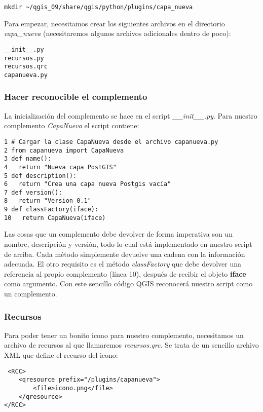 \begin{verbatim}
mkdir ~/qgis_09/share/qgis/python/plugins/capa_nueva
\end{verbatim}

Para empezar, necesitamos crear los siguientes archivos en el directorio \textsl{capa\_nueva}
  (necesitaremos algunos archivos adicionales dentro de poco):

\begin{verbatim}
__init__.py 
recursos.py
recursos.qrc
capanueva.py
\end{verbatim} 

\subsubsection{Hacer reconocible el complemento}

La inicialización del complemento se hace en el script \textsl{\_\_init\_\_.py}. Para nuestro 
complemento \textsl{CapaNueva} el script contiene:

\begin{verbatim}
1 # Cargar la clase CapaNueva desde el archivo capanueva.py
2 from capanueva import CapaNueva
3 def name():
4   return "Nueva capa PostGIS"
5 def description():
6   return "Crea una capa nueva Postgis vacía"
7 def version():
8   return "Version 0.1"
9 def classFactory(iface):
10   return CapaNueva(iface)
\end{verbatim} 

Las cosas que un complemento debe devolver de forma imperativa son un nombre, descripción y
versión, todo lo cual está implementado en nuestro script de arriba. Cada método simplemente 
devuelve una cadena con la información adecuada. El otro requisito es el método \textsl{classFactory} 
que debe devolver una referencia al propio complemento (línea 10), después de recibir el objeto 
\textbf{iface} como argumento. Con este sencillo código QGIS  reconocerá nuestro script como 
un complemento.

\subsubsection{Recursos}

Para poder tener un bonito icono para nuestro complemento, necesitamos un archivo de recursos
al que llamaremos \textsl{recursos.qrc}. Se trata de un sencillo archivo XML que define el 
recurso del icono:

\begin{verbatim}
 <RCC>
    <qresource prefix="/plugins/capanueva">
        <file>icono.png</file>
    </qresource>
</RCC> 
\end{verbatim} 

